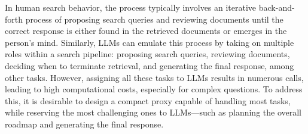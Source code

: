 In human search behavior, the process typically involves an iterative back-and-forth process of proposing search queries and reviewing documents until the correct response is either found in the retrieved documents or emerges in the person’s mind. 
Similarly, LLMs can emulate this process by taking on multiple roles within a search pipeline: proposing search queries, reviewing documents, deciding when to terminate retrieval, and generating the final response, among other tasks.
However, assigning all these tasks to LLMs results in numerous calls, leading to high computational costs, especially for complex questions. 
To address this, it is desirable to design a compact proxy capable of handling most tasks, while reserving the most challenging ones to LLMs—such as planning the overall roadmap and generating the final response. %



